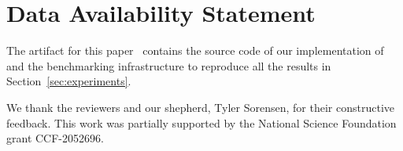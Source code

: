 \documentclass[sigconf,screen]{acmart}
\begin{document}

\maketitle







%
%
% 






\section{Data Availability Statement}
The artifact for this paper~\cite{coconet-artifact} contains the source code of our implementation of \tool and the benchmarking infrastructure to reproduce all the results in Section~\ref{sec:experiments}.

\begin{acks}
We thank the reviewers and our shepherd, Tyler Sorensen, for their constructive feedback.
This work was partially supported by the National Science Foundation grant CCF-2052696.
\end{acks}


\balance



\end{document}
